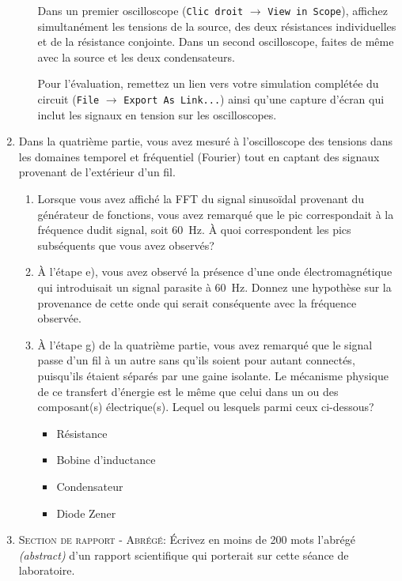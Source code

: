 \documentclass[canadien,12pt,oneside,letterpaper]{article}
\begin{document}
\begin{enumerate}
\begin{enumerate}
        Dans un premier oscilloscope (\texttt{Clic droit} $\rightarrow$ \texttt{View in Scope}), affichez simultanément les tensions de la source, des deux résistances individuelles et de la résistance conjointe. Dans un second oscilloscope, faites de même avec la source et les deux condensateurs.\par
        Pour l'évaluation, remettez un lien vers votre simulation complétée du circuit (\texttt{File} $\rightarrow$ \texttt{Export As Link...}) ainsi qu'une capture d'écran qui inclut les signaux en tension sur les oscilloscopes.\par
        \noindent{}
    \end{enumerate}
    \vspace{1ex}
    \item Dans la quatrième partie, vous avez mesuré à l'oscilloscope des tensions dans les domaines temporel et fréquentiel (Fourier) tout en captant des signaux provenant de l'extérieur d'un fil.
    \begin{enumerate} 
        \item Lorsque vous avez affiché la FFT du signal sinusoïdal provenant du générateur de fonctions, vous avez remarqué que le pic correspondait à la fréquence dudit signal, soit 60~Hz. À quoi correspondent les pics subséquents que vous avez observés?
        \item À l'étape e), vous avez observé la présence d'une onde électromagnétique qui introduisait un signal parasite à 60~Hz. Donnez une hypothèse sur la provenance de cette onde qui serait conséquente avec la fréquence observée.
        \item À l'étape g) de la quatrième partie, vous avez remarqué que le signal passe d'un fil à un autre sans qu'ils soient pour autant connectés, puisqu'ils étaient séparés par une gaine isolante. Le mécanisme physique de ce transfert d'énergie est le même que celui dans un ou des composant(s) électrique(s). Lequel ou lesquels parmi ceux ci-dessous?
        \begin{itemize}
        \item Résistance
        \item Bobine d'inductance
        \item Condensateur
        \item Diode Zener
        \end{itemize}
    \end{enumerate}
    \item \textsc{Section de rapport - Abrégé:} Écrivez en moins de 200 mots l'abrégé \textit{(abstract)} d'un rapport scientifique qui porterait sur cette séance de laboratoire.
\end{enumerate}
\end{document}
